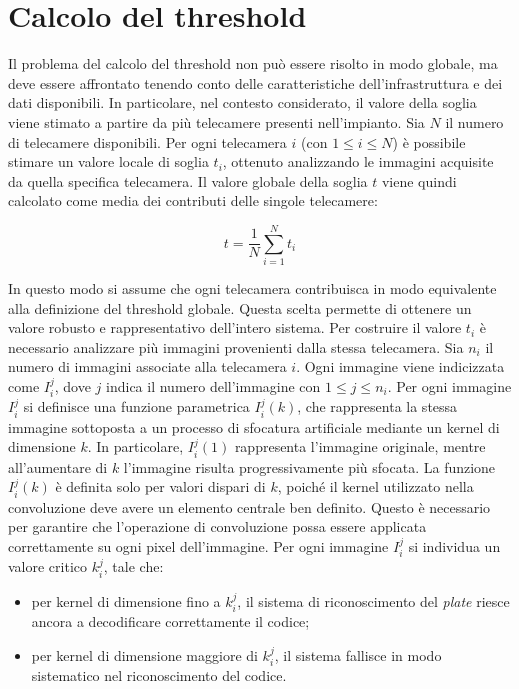 \documentclass[
    target=bach,
    aauheader=,
    style=
]{thud}
\begin{document}
\section{Calcolo del threshold}

Il problema del calcolo del threshold non può essere risolto in modo globale, ma deve essere affrontato tenendo conto delle caratteristiche dell'infrastruttura e dei dati disponibili. In particolare, nel contesto considerato, il valore della soglia viene stimato a partire da più telecamere presenti nell'impianto. Sia $N$ il numero di telecamere disponibili. Per ogni telecamera $i$ (con $1 \le i \le N$) è possibile stimare un valore locale di soglia $t_i$, ottenuto analizzando le immagini acquisite da quella specifica telecamera. Il valore globale della soglia $t$ viene quindi calcolato come media dei contributi delle singole telecamere:

\begin{equation}
t = \frac{1}{N} \sum_{i=1}^{N} t_i
\end{equation}

In questo modo si assume che ogni telecamera contribuisca in modo equivalente alla definizione del threshold globale. Questa scelta permette di ottenere un valore robusto e rappresentativo dell'intero sistema. Per costruire il valore $t_i$ è necessario analizzare più immagini provenienti dalla stessa telecamera. Sia $n_i$ il numero di immagini associate alla telecamera $i$. Ogni immagine viene indicizzata come $I_i^j$, dove $j$ indica il numero dell'immagine con $1 \le j \le n_i$. Per ogni immagine $I_i^j$ si definisce una funzione parametrica $I_i^j(k)$, che rappresenta la stessa immagine sottoposta a un processo di sfocatura artificiale mediante un kernel di dimensione $k$. In particolare, $I_i^j(1)$ rappresenta l'immagine originale, mentre all'aumentare di $k$ l'immagine risulta progressivamente più sfocata. La funzione $I_i^j(k)$ è definita solo per valori dispari di $k$, poiché il kernel utilizzato nella convoluzione deve avere un elemento centrale ben definito. Questo è necessario per garantire che l'operazione di convoluzione possa essere applicata correttamente su ogni pixel dell'immagine. Per ogni immagine $I_i^j$ si individua un valore critico $k_i^j$, tale che:

\begin{itemize}
    \item per kernel di dimensione fino a $k_i^j$, il sistema di riconoscimento del \textit{plate} riesce ancora a decodificare correttamente il codice;
    \item per kernel di dimensione maggiore di $k_i^j$, il sistema fallisce in modo sistematico nel riconoscimento del codice.
\end{itemize}
\end{document}
